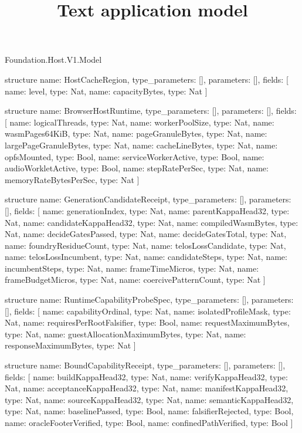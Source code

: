 \begin{lexlean}{Foundation.Host.V1.Model}
\title{Text application model}
\begin{semanticmodule}
structure{
  name: HostCacheRegion,
  type_parameters: [],
  parameters: [],
  fields: [
    {name: level, type: Nat},
    {name: capacityBytes, type: Nat}
  ]
}

structure{
  name: BrowserHostRuntime,
  type_parameters: [],
  parameters: [],
  fields: [
    {name: logicalThreads, type: Nat},
    {name: workerPoolSize, type: Nat},
    {name: wasmPages64KiB, type: Nat},
    {name: pageGranuleBytes, type: Nat},
    {name: largePageGranuleBytes, type: Nat},
    {name: cacheLineBytes, type: Nat},
    {name: opfsMounted, type: Bool},
    {name: serviceWorkerActive, type: Bool},
    {name: audioWorkletActive, type: Bool},
    {name: stepRatePerSec, type: Nat},
    {name: memoryRateBytesPerSec, type: Nat}
  ]
}

structure{
  name: GenerationCandidateReceipt,
  type_parameters: [],
  parameters: [],
  fields: [
    {name: generationIndex, type: Nat},
    {name: parentKappaHead32, type: Nat},
    {name: candidateKappaHead32, type: Nat},
    {name: compiledWasmBytes, type: Nat},
    {name: decideGatesPassed, type: Nat},
    {name: decideGatesTotal, type: Nat},
    {name: foundryResidueCount, type: Nat},
    {name: telosLossCandidate, type: Nat},
    {name: telosLossIncumbent, type: Nat},
    {name: candidateSteps, type: Nat},
    {name: incumbentSteps, type: Nat},
    {name: frameTimeMicros, type: Nat},
    {name: frameBudgetMicros, type: Nat},
    {name: coercivePatternCount, type: Nat}
  ]
}

structure{
  name: RuntimeCapabilityProbeSpec,
  type_parameters: [],
  parameters: [],
  fields: [
    {name: capabilityOrdinal, type: Nat},
    {name: isolatedProfileMask, type: Nat},
    {name: requiresPerRootFalsifier, type: Bool},
    {name: requestMaximumBytes, type: Nat},
    {name: guestAllocationMaximumBytes, type: Nat},
    {name: responseMaximumBytes, type: Nat}
  ]
}

structure{
  name: BoundCapabilityReceipt,
  type_parameters: [],
  parameters: [],
  fields: [
    {name: buildKappaHead32, type: Nat},
    {name: verifyKappaHead32, type: Nat},
    {name: acceptanceKappaHead32, type: Nat},
    {name: manifestKappaHead32, type: Nat},
    {name: sourceKappaHead32, type: Nat},
    {name: semanticKappaHead32, type: Nat},
    {name: baselinePassed, type: Bool},
    {name: falsifierRejected, type: Bool},
    {name: oracleFooterVerified, type: Bool},
    {name: confinedPathVerified, type: Bool}
  ]
}


\end{semanticmodule}
\end{lexlean}
